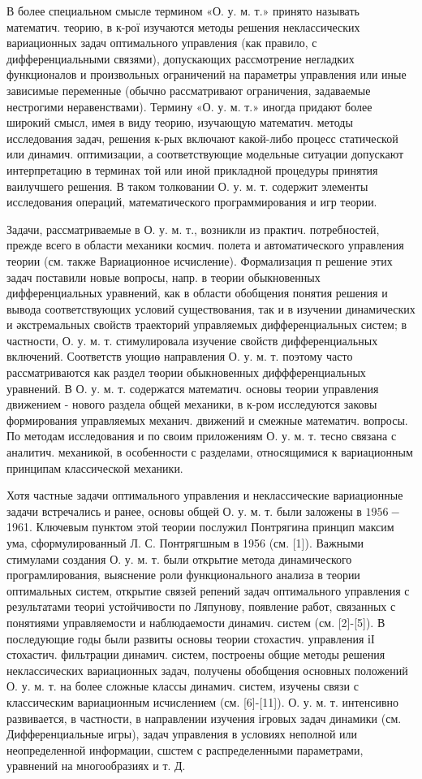 \documentclass[10pt]{article}
\begin{document}
В более специальном смысле термином «О. у. м. т.» принято называть математич. теорию, в к-рої изучаются методы решения неклассических вариационных задач оптимального управления (как правило, с дифференциальными связями), допускающих рассмотрение негладких функционалов и произвольных ограничений на параметры управления или иные зависимые переменные (обычно рассматривают ограничения, задаваемые нестрогими неравенствами). Термину «О. у. м. т.» иногда придают более широкий смысл, имея в виду теорию, изучающую математич. методы исследования задач, решения к-рых включают какой-либо процесс статической или динамич. оптимизации, а соответствующие модельные ситуации допускают интерпретацию в терминах той или иной прикладной процедуры принятия ваилучшего решения. В таком толковании О. у. м. т. содержит элементы исследования операций, математического программирования и игр теории.

Задачи, рассматриваемые в О. у. м. т., возникли из практич. потребностей, прежде всего в области механики космич. полета и автоматического управления теории (см. также Вариационное исчисление). Формализация п решение этих задач поставили новые вопросы, напр. в теории обыкновенных дифференциальных уравнений, как в области обобщения понятия решения и вывода соответствующих условий существования, так и в изучении динамических и әкстремальных свойств траекторий управляемых дифференциальных систем; в частности, О. у. м. т. стимулировала изучение свойств дифференциальных включений. Соответств ующиө направления О. у. м. т. поэтому часто рассматриваются как раздел төории обыкновенных диффференциальных уравнений. В О. у. м. т. содержатся математич. основы теории управления движением - нового раздела общей механики, в к-ром исследуются заковы формирования управляемых механич. движений и смежные математич. вопросы. По методам исследования и по своим приложениям О. у. м. т. тесно связана с аналитич. механикой, в особенности с разделами, относящимися к вариационным принципам классической механики.

Хотя частные задачи оптимального управления и неклассические вариационные задачи встречались и ранее, основы общей О. у. м. т. были заложены в $1956-$ 1961. Ключевым пунктом этой теории послужил Понтрягина принцип максим ума, сформулированный Л. С. Понтрягшным в 1956 (см. [1]). Важными стимулами создания О. у. м. т. были открытие метода динамического програмлирования, выяснение роли функционального анализа в теории оптимальных систем, открытие связей репений задач оптимального управления с результатами теориі устойчивости по Ляпунову, появление работ, связанных с понятиями управляемости и наблюдаемости динамич. систем (см. [2]-[5]). В последующие годы были развиты основы теории стохастич. управления іІ стохастич. фильтрации динамич. систем, построены общие методы решения неклассических вариационных задач, получены обобщения основных положений О. у. м. т. на более сложные классы динамич. систем, изучены связи с классическим вариационным исчислением (см. [6]-[11]). О. у. м. т. интенсивно развивается, в частности, в направлении изучения ігровых задач динамики (см. Дифференциальные игры), задач управления в условиях неполной или неопределенной информации, сшстем с распределенными параметрами, уравнений на многообразиях и т. Д.
\end{document}
